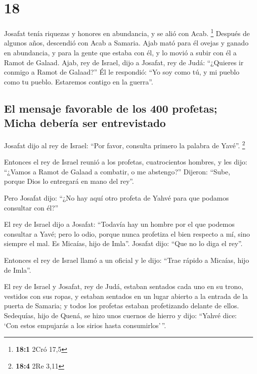 \hypertarget{section-17}{%
\section{18}\label{section-17}}

 Josafat tenía riquezas y honores en abundancia, y se alió
con Acab. \footnote{\textbf{18:1} 2Cró 17,5}  Después de
algunos años, descendió con Acab a Samaria. Ajab mató para él ovejas y
ganado en abundancia, y para la gente que estaba con él, y lo movió a
subir con él a Ramot de Galaad.  Ajab, rey de Israel, dijo
a Josafat, rey de Judá: ``¿Quieres ir conmigo a Ramot de Galaad?'' Él le
respondió: ``Yo soy como tú, y mi pueblo como tu pueblo. Estaremos
contigo en la guerra''.

\hypertarget{el-mensaje-favorable-de-los-400-profetas-micha-deberuxeda-ser-entrevistado}{%
\subsection{El mensaje favorable de los 400 profetas; Micha debería ser
entrevistado}\label{el-mensaje-favorable-de-los-400-profetas-micha-deberuxeda-ser-entrevistado}}

 Josafat dijo al rey de Israel: ``Por favor, consulta
primero la palabra de Yavé''. \footnote{\textbf{18:4} 2Re 3,11}

 Entonces el rey de Israel reunió a los profetas,
cuatrocientos hombres, y les dijo: ``¿Vamos a Ramot de Galaad a
combatir, o me abstengo?'' Dijeron: ``Sube, porque Dios lo entregará en
mano del rey''.

 Pero Josafat dijo: ``¿No hay aquí otro profeta de Yahvé
para que podamos consultar con él?''

 El rey de Israel dijo a Josafat: ``Todavía hay un hombre
por el que podemos consultar a Yavé; pero lo odio, porque nunca
profetiza el bien respecto a mí, sino siempre el mal. Es Micaías, hijo
de Imla''. Josafat dijo: ``Que no lo diga el rey''.

 Entonces el rey de Israel llamó a un oficial y le dijo:
``Trae rápido a Micaías, hijo de Imla''.

 El rey de Israel y Josafat, rey de Judá, estaban sentados
cada uno en su trono, vestidos con sus ropas, y estaban sentados en un
lugar abierto a la entrada de la puerta de Samaria; y todos los profetas
estaban profetizando delante de ellos.  Sedequías, hijo
de Quená, se hizo unos cuernos de hierro y dijo: ``Yahvé dice: `Con
estos empujarás a los sirios hasta consumirlos'\,''.

